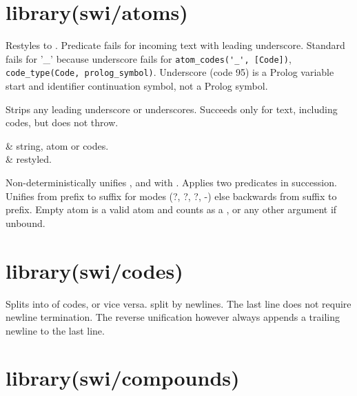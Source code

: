 \chapter{library(swi/atoms)}\label{sec:atoms}

\begin{description}
Restyles  to . Predicate  fails for
incoming text with leading underscore. Standard
 fails for '_' because underscore fails for
\verb$atom_codes('_', [Code])$, \verb$code_type(Code, prolog_symbol)$. Underscore
(code 95) is a Prolog variable start and identifier continuation
symbol, not a Prolog symbol.

Strips any leading underscore or underscores. Succeeds only for
text, including codes, but does not throw.

\begin{arguments}
 & string, atom or codes. \\
 & restyled. \\
\end{arguments}

Non-deterministically unifies ,  and  with .
Applies two  predicates in succession. Unifies from
prefix to suffix for modes (?, ?, ?, -) else backwards from suffix
to prefix. Empty atom is a valid atom and counts as a , 
or any other argument if unbound.
\end{description}

\chapter{library(swi/codes)}\label{sec:codes}

\begin{description}
Splits  into  of codes, or vice versa.  split by
newlines. The last line does not require newline termination. The
reverse unification however always appends a trailing newline to the
last line.
\end{description}

\chapter{library(swi/compounds)}\label{sec:compounds}

